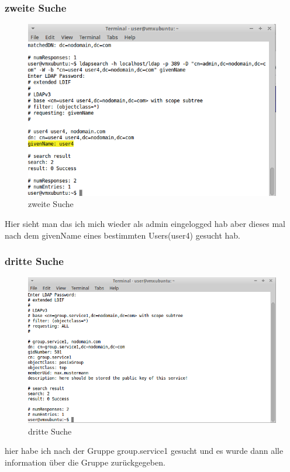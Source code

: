 \subsubsection{zweite Suche}

\begin{figure}[!h]
	\begin{center}
		\includegraphics[width=0.8\linewidth]{images/2ndSearch.png}
		\caption{zweite Suche \cite{tanenbaum2007verteilte}}
		\label{broker}
	\end{center}
\end{figure}
Hier sieht man das ich mich wieder als admin eingelogged hab aber dieses mal nach dem givenName eines bestimmten Users(user4) gesucht hab.
\clearpage	

\subsubsection{dritte Suche}

\begin{figure}[!h]
	\begin{center}
		\includegraphics[width=0.8\linewidth]{images/3rdSearch.png}
		\caption{dritte Suche \cite{tanenbaum2007verteilte}}
		\label{broker}
	\end{center}
\end{figure}
hier habe ich nach der Gruppe group.service1 gesucht und es wurde dann alle information über die Gruppe zurückgegeben.



